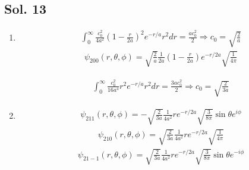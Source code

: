   \subsection*{Sol. 13}
  \begin{enumerate}
      \item 
      \begin{align*}
          \int_0^\infty 
          \frac{c_0^2}{4a^2}
          \left(
          1-\frac{r}{2a}
          \right)^2
          e^{-r/a}
          r^2dr=\frac{ac_0^2}{2}
          \Rightarrow c_0=\sqrt{\frac{2}{a}}
      \end{align*}
      \begin{align*}
          \psi_{200}(r,\theta,\phi)
          =
          \sqrt{\frac{2}{a}}
          \frac{1}{2a}
          \left(1-\frac{r}{2a}\right)
          e^{-r/2a}
          \sqrt{\frac{1}{4\pi}}
      \end{align*}

      \begin{align*}
          \int_0^\infty 
          \frac{c_0^2}{16a^4}
          r^2
          e^{-r/a}
          r^2dr=\frac{3ac_0^2}{2}
          \Rightarrow c_0=\sqrt{\frac{2}{3a}}
      \end{align*}
      \item 
      \begin{align*}
          \psi_{211}(r,\theta,\phi)
          =
          -\sqrt{\frac{2}{3a}}
          \frac{1}{4a^2}
          r
          e^{-r/2a}
          \sqrt{\frac{3}{8\pi}}
          \sin\theta e^{i\phi}
      \end{align*}
        \begin{align*}
          \psi_{210}(r,\theta,\phi)
          =
          \sqrt{\frac{2}{3a}}
          \frac{1}{4a^2}
          r
          e^{-r/2a}
          \sqrt{\frac{1}{4\pi}}
      \end{align*}
      \begin{align*}
          \psi_{21-1}(r,\theta,\phi)
          =\sqrt{\frac{2}{3a}}
          \frac{1}{4a^2}
          r
          e^{-r/2a}
          \sqrt{\frac{3}{8\pi}}
          \sin\theta 
          e^{-i\phi}
      \end{align*}
  \end{enumerate}

